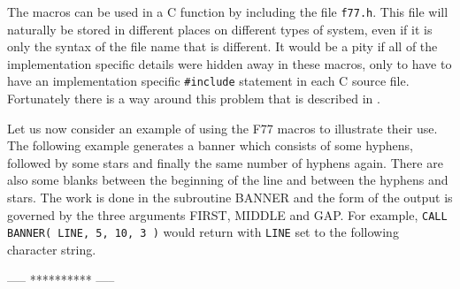 \documentclass[twoside,11pt,nolof]{starlink}
\begin{document}
The macros can be used in a C function by including the file \texttt{f77.h}.
This file will naturally be stored in different places on different types of
system, even if it is only the syntax of the file name that is different.
It would be a
pity if all of the implementation specific details were hidden away in these
macros, only to have to have an implementation specific \texttt{\#include}
statement in each C source file. Fortunately there is a way around this
problem that is described in
 .

Let us now consider an example of using the F77 macros to illustrate
their use.
The following example generates a banner which
consists of some hyphens, followed by some stars and finally the same number
of hyphens again. There are also some blanks between the beginning of the line
and between the hyphens and stars. The work is done in the subroutine BANNER
and the form of the output is governed by the three arguments FIRST, MIDDLE and
GAP\@. For example,
\texttt{CALL BANNER( LINE, 5, 10, 3 )} would return with \texttt{LINE} set to
the following character string.

\begin{terminalv}
-----   **********   -----
\end{terminalv}
\end{document}
